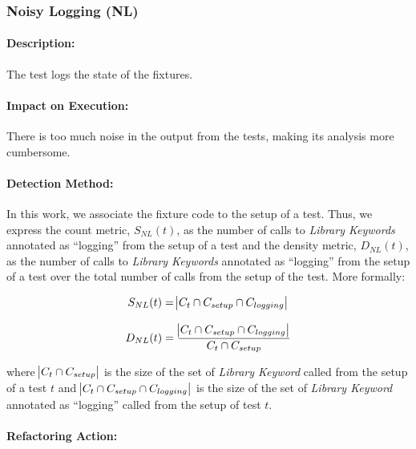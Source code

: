 \subsubsection{Noisy Logging (NL)}

\paragraph{Description:}

The test logs the state of the fixtures.

\paragraph{Impact on Execution:} 

There is too much noise in the output from the tests, making its analysis more cumbersome.

\paragraph{Detection Method:}

In this work, we associate the fixture code to the setup of a test. Thus, we express the count metric, $S_{NL}(t)$, as the number of calls to \emph{Library Keywords} annotated as ``logging'' from the setup of a test and the density metric, $D_{NL}(t)$, as the number of calls to \emph{Library Keywords} annotated as ``logging'' from the setup of a test over the total number of calls from the setup of the test. More formally:

\begin{equation*}
    S_{NL}(t) = \abs{C_{t} \cap C_{setup} \cap C_{logging}}
\end{equation*}

\begin{equation*}
    D_{NL}(t) = \frac{\abs{C_{t} \cap C_{setup} \cap C_{logging}}}{C_{t} \cap C_{setup}}
\end{equation*}

where $\abs{C_{t} \cap C_{setup}}$ is the size of the set of \emph{Library Keyword} called from the setup of a test $t$ and $\abs{C_{t} \cap C_{setup} \cap C_{logging}}$  is the size of the set of \emph{Library Keyword} annotated as ``logging'' called from the setup of test $t$.

\paragraph{Refactoring Action:}

